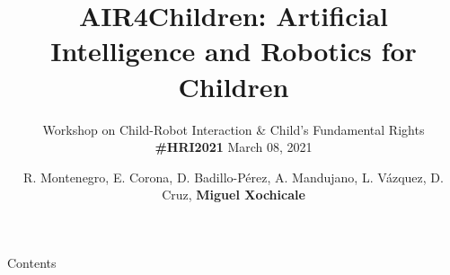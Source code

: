 \documentclass[xcolor={dvipsnames},aspectratio=169,10pt]{beamer}
\title{AIR4Children: Artificial Intelligence and Robotics for Children}
\subtitle{
Workshop on Child-Robot Interaction \& Child's Fundamental Rights \\ 
 {\bf \#HRI2021} March 08, 2021
}
\author{
R. Montenegro,
E. Corona,
D. Badillo-P\'erez,
A. Mandujano,
L. V\'azquez,
D. Cruz,
{\bf Miguel Xochicale}
}
\date{
}
\institute{
	\faEnvelope   air4children@gmail.com \\
	\faGithubAlt @air4children \faTwitter @air4children  
		}
\begin{document}
\maketitle

\begin{frame}{Contents}
    \tableofcontents
\end{frame}







\maketitle
\end{document}
